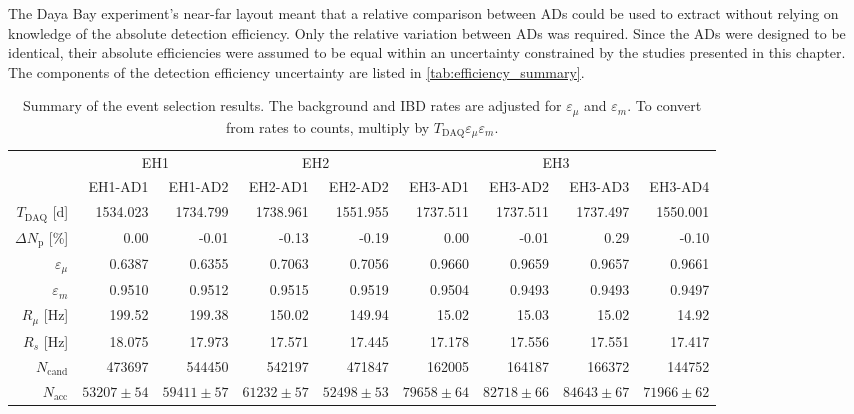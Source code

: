 The Daya Bay experiment's near-far layout meant that a relative comparison
between ADs could be used to extract \thetaot{}
without relying on knowledge of the absolute detection efficiency.
Only the relative variation between ADs was required.
Since the ADs were designed to be identical,
their absolute efficiencies were assumed to be equal
within an uncertainty constrained by the studies presented in this chapter.
The components of the detection efficiency uncertainty
are listed in \cref{tab:efficiency_summary}.

\begin{table}[ht]
    \caption[Event selection summary]{
        Summary of the \nuebar{} event selection results.
        The background and IBD rates are adjusted for
        $\varepsilon_\mu$ and $\varepsilon_m$.
        To convert from rates to counts, multiply by
        $T_\text{DAQ}\varepsilon_\mu\varepsilon_m$.
    }
    \label{tab:summary_event_selection}
    \centering
    \tiny
    \setlength{\tabcolsep}{2.5pt}
    \begin{tabular}[t]{rrrrrrrrr}  %
        \toprule
        & \multicolumn{2}{c}{EH1}
        & \multicolumn{2}{c}{EH2}
        & \multicolumn{4}{c}{EH3} \\
        \cmidrule(l){2-3} \cmidrule(l){4-5} \cmidrule(l){6-9}
        & EH1-AD1&EH1-AD2&EH2-AD1&EH2-AD2&EH3-AD1&EH3-AD2&EH3-AD3&EH3-AD4 \\
\midrule
        $T_{\text{DAQ}}$ [\si{\day}]& 1534.023&1734.799&1738.961&1551.955&1737.511&1737.511&1737.497&1550.001 \\
        $\Delta N_{\text{p}}$ [\%]& 0.00&-0.01&-0.13&-0.19&0.00&-0.01&0.29&-0.10 \\
        $\varepsilon_{\mu}$& 0.6387&0.6355&0.7063&0.7056&0.9660&0.9659&0.9657&0.9661 \\
        $\varepsilon_{m}$& 0.9510&0.9512&0.9515&0.9519&0.9504&0.9493&0.9493&0.9497 \\
        $R_{\mu}$ [\si{\Hz}]& 199.52&199.38&150.02&149.94&15.02&15.03&15.02&14.92 \\
        $R_s$ [\si{\Hz}]& 18.075&17.973&17.571&17.445&17.178&17.556&17.551&17.417 \\
\arrayrulecolor{lightgray}
\midrule
\arrayrulecolor{black}
        $N_{\text{cand}}$& 473697&544450&542197&471847&162005&164187&166372&144752 \\
        $N_{\text{acc}}$& $53207 \pm 54$&$59411 \pm 57$&$61232 \pm 57$&$52498 \pm 53$&$79658 \pm 64$&$82718 \pm 66$&$84643 \pm 67$&$71966 \pm 62$ \\

\end{tabular}
\end{table}
